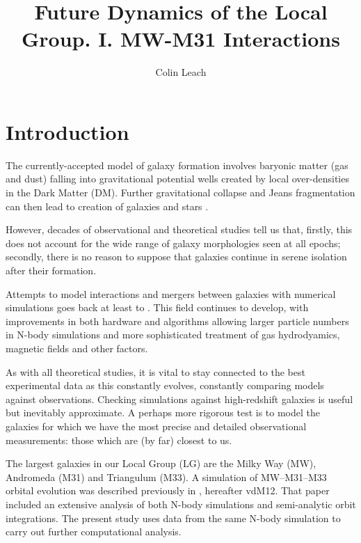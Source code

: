 \documentclass[twocolumn]{aastex63}
\newcommand{\todo}{\color{red}{TODO}\color{black}\hspace{2mm}}
\begin{document}
	
\title{Future Dynamics of the Local Group. I. MW-M31 Interactions}

\author[0000-0003-3608-1546]{Colin Leach}

\begin{abstract}
	
\todo{Add a concise and intelligent summary of the paper, once I get a clearer idea what it will include (and how to seem intelligent).}
	
\end{abstract}




\section{Introduction}

The currently-accepted model of galaxy formation involves baryonic matter (gas and dust) falling into gravitational potential wells created by local over-densities in the Dark Matter (DM). Further gravitational collapse and Jeans fragmentation can then lead to creation of galaxies and stars \citep{mo_galaxy_2010}.

However, decades of observational and theoretical studies tell us that, firstly, this does not account for the wide range of galaxy morphologies seen at all epochs; secondly, there is no reason to suppose that galaxies continue in serene isolation after their formation.

Attempts to model interactions and mergers between galaxies with numerical simulations goes back at least to \citet{toomre_galactic_1972}. This field continues to develop, with improvements in both hardware and algorithms allowing larger particle numbers in N-body simulations \todo{refs?} and more sophisticated treatment of gas hydrodyamics, magnetic fields and other factors.

As with all theoretical studies, it is vital to stay connected to the best experimental data as this constantly evolves, constantly comparing models against observations. Checking simulations against high-redshift galaxies is useful but inevitably approximate. A perhaps more rigorous test is to model the galaxies for which we have the most precise and detailed observational measurements: those which are (by far) closest to us. 

The largest galaxies in our Local Group (LG) are the Milky Way (MW), Andromeda (M31) and Triangulum (M33).  A simulation of MW--M31--M33 orbital evolution was described previously in \citet{marel_m31_2012}, hereafter vdM12. That paper included an extensive analysis of both N-body simulations and semi-analytic orbit integrations. The present study uses data from the same N-body simulation to carry out further computational analysis.
\end{document}
